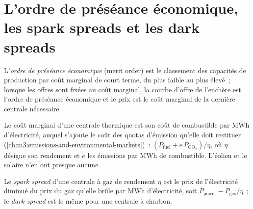 \section{L'ordre de préséance économique, les spark spreads et les dark spreads}

\begin{definition}\label{def:m3:power-markets-design:merit}
L'\emph{ordre de préséance économique} (merit order) est le classement des capacités de production par
coût marginal de court terme, du plus faible au plus élevé~; lorsque les offres sont fixées au coût marginal, la
courbe d'offre de l'enchère est l'ordre de préséance économique et le prix est le coût marginal de la dernière
centrale nécessaire.
\end{definition}

Le coût marginal d'une centrale thermique est son coût de combustible par MWh d'électricité, auquel s'ajoute le coût
des quotas d'émission qu'elle doit restituer (\cref{ch:m3:emissions-and-environmental-markets})~:
$(P_{\mathrm{fuel}} + e\,P_{\mathrm{CO_2}})/\eta$, où $\eta$ désigne son rendement et $e$ les
émissions par MWh de combustible. L'éolien et le solaire n'en ont presque aucune.

\begin{definition}\label{def:m3:power-markets-design:spark}
Le \emph{spark spread} d'une centrale à gaz de rendement $\eta$ est le prix de l'électricité
diminué du prix du gaz qu'elle brûle par MWh d'électricité,
soit $P_{\mathrm{power}} - P_{\mathrm{gas}}/\eta$~; le \emph{dark spread} est
le même pour une centrale à charbon.
\end{definition}

